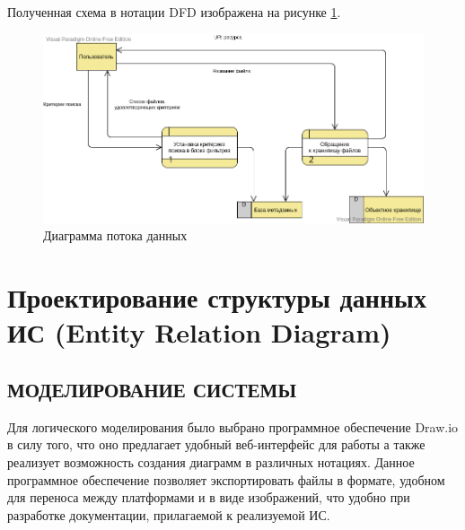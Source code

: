 \documentclass[a4paper,14pt]{extarticle}
\begin{document}
Полученная схема в нотации DFD изображена на рисунке \ref{fig:dfd}.
\begin{figure}[h!]
	\centering
	\includegraphics[width=0.9\linewidth]{images/dfd}
	\caption{Диаграмма потока данных}
	\label{fig:dfd}
\end{figure}

\clearpage
\section{Проектирование структуры данных ИС (Entity Relation Diagram)}


\subsection{МОДЕЛИРОВАНИЕ СИСТЕМЫ}
Для логического моделирования было выбрано программное обеспечение Draw.io в силу того, что оно предлагает удобный веб-интерфейс для работы а также реализует возможность создания диаграмм в различных нотациях. Данное программное обеспечение позволяет экспортировать файлы в формате, удобном для переноса между платформами и в виде изображений, что удобно при разработке документации, прилагаемой к реализуемой ИС.
\end{document}
